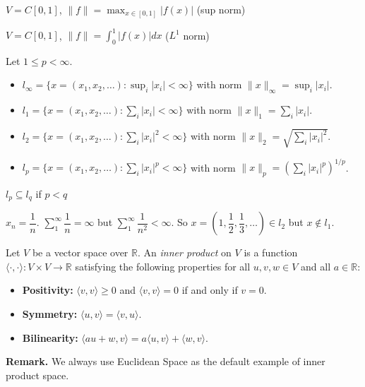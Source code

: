 \documentclass[main.tex]{subfiles}
\begin{document}
\begin{example}
    $V = C[0, 1]$, $\|f\| = \max_{x \in [0, 1]} |f(x)|$ (sup norm) 
\end{example}

\begin{example}
    $V = C[0, 1]$, $\|f\| = \int_0^1 |f(x)| dx$ ($L^1$ norm) 
\end{example}

\begin{definition}
    [$l_p$-Spaces]
    Let $1 \le p < \infty$. 
\begin{itemize}
    \item $l_{\infty} = \{x = (x_1, x_2, \ldots) : \sup_i |x_i| < \infty\}$ with norm $\|x\|_{\infty} = \sup_i |x_i|$.
    \item $l_1 = \{x = (x_1, x_2, \ldots) : \sum_i |x_i| < \infty\}$ with norm $\|x\|_1 = \sum_i |x_i|$. 
    \item $l_2 = \{x = (x_1, x_2, \ldots) : \sum_i |x_i|^2 < \infty\}$ with norm $\|x\|_2 = \sqrt{\sum_i |x_i|^2}$.
    \item $l_p = \{x = (x_1, x_2, \ldots) : \sum_i |x_i|^p < \infty\}$ with norm $\|x\|_p = (\sum_i |x_i|^p)^{1/p}$.
\end{itemize}
\end{definition}

\begin{property}
$l_p \subseteq l_q$ if $p < q$ 
\end{property}

\begin{example}
    $x_n = \dfrac{1}{n}$. $\sum_{1}^{\infty} \dfrac{1}{n} = \infty$ but $\sum_{1}^{\infty} \dfrac{1}{n^2} < \infty$. So $x = (1, \dfrac{1}{2}, \dfrac{1}{3}, \ldots) \in l_2$ but $x \notin l_1$. 
\end{example}

\begin{definition}
    Let $V$ be a vector space over $\mathbb{R}$. An \emph{inner product} on $V$ is a function $\langle \cdot, \cdot \rangle: V \times V \to \mathbb{R}$ satisfying the following properties for all $u, v, w \in V$ and all $a \in \mathbb{R}$:
\begin{itemize}
    \item \textbf{Positivity:} $\langle v, v \rangle \ge 0$ and $\langle v, v \rangle = 0$ if and only if $v = 0$.
    \item \textbf{Symmetry:} $\langle u, v \rangle = \langle v, u \rangle$.
    \item \textbf{Bilinearity:} $\langle au + w, v \rangle = a\langle u, v \rangle + \langle w, v \rangle$. 
\end{itemize}
\end{definition}
\par \noindent \textbf{Remark. } We always use Euclidean Space as the default example of inner product space.
\end{document}
